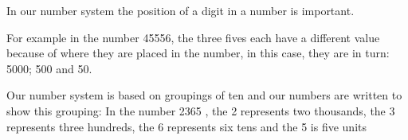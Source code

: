 In our number system the position of a digit in a number is important.

\par
For example in the number 45556, the three fives each have a different value because of where 
they are placed in the number, in this case, they are in turn:  5000;  500 and 50.

\par
Our number system is based on groupings of ten and our numbers are written to show this grouping:  
In the  number 2365 , the 2 represents two thousands, the 3 represents three hundreds, 
the 6 represents six tens and the 5 is five units